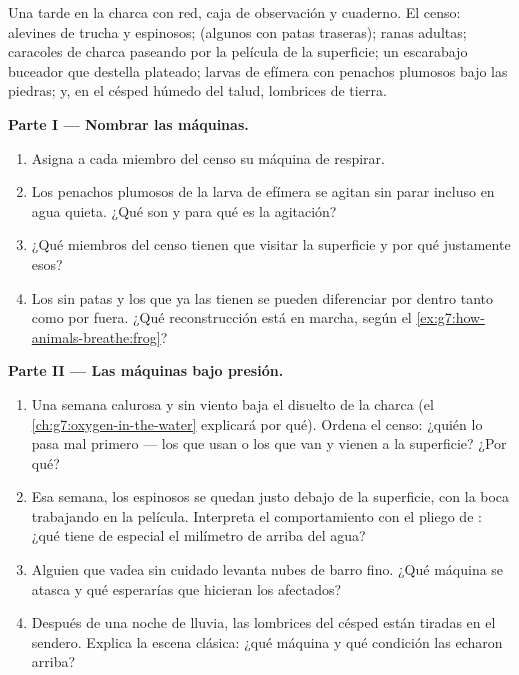 \begin{problem}\label{pb:g7:how-animals-breathe:1}
Una tarde en la charca con red, caja de observación y cuaderno. El
censo: alevines de trucha y espinosos;  (algunos con patas
traseras); ranas adultas; caracoles de charca paseando por la película
de la superficie; un escarabajo buceador que destella plateado; larvas
de efímera con penachos plumosos bajo las piedras; y, en el césped
húmedo del talud, lombrices de tierra.

\medskip\noindent\textbf{Parte I --- Nombrar las máquinas.}
\begin{enumerate}
  \item Asigna a cada miembro del censo su máquina de respirar.
  \item Los penachos plumosos de la larva de efímera se agitan sin
        parar incluso en agua quieta. ¿Qué son y para qué es la
        agitación?
  \item ¿Qué miembros del censo tienen que visitar la superficie y por
        qué justamente esos?
  \item Los  sin patas y los que ya las tienen se pueden
        diferenciar por dentro tanto como por fuera. ¿Qué
        reconstrucción está en marcha, según el
        \cref{ex:g7:how-animals-breathe:frog}?
\end{enumerate}

\medskip\noindent\textbf{Parte II --- Las máquinas bajo presión.}
\begin{enumerate}[resume]
  \item Una semana calurosa y sin viento baja el  disuelto de la
        charca (el \cref{ch:g7:oxygen-in-the-water} explicará por qué).
        Ordena el censo: ¿quién lo pasa mal primero --- los que usan
         o los que van y vienen a la superficie? ¿Por qué?
  \item Esa semana, los espinosos se quedan justo debajo de la
        superficie, con la boca trabajando en la película. Interpreta
        el comportamiento con el pliego de : ¿qué tiene de
        especial el milímetro de arriba del agua?
  \item Alguien que vadea sin cuidado levanta nubes de barro fino. ¿Qué
        máquina se atasca y qué esperarías que hicieran los 
        afectados?
  \item Después de una noche de lluvia, las lombrices del césped están
        tiradas en el sendero. Explica la escena clásica: ¿qué máquina
        y qué condición las echaron arriba?
\end{enumerate}


\end{problem}
